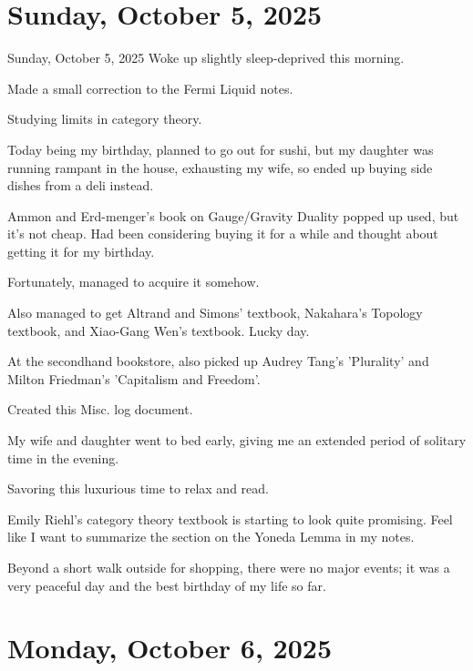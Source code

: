 \documentclass[dvipdfmx, autodetect-engine, aspectratio=169, 10.5pt]{beamer}
\begin{document}
\section{Sunday, October 5, 2025}

\begin{frame}{Sunday, October 5, 2025}
	\scriptsize
	Woke up slightly sleep-deprived this morning.

	Made a small correction to the Fermi Liquid notes.

	Studying limits in category theory.

	Today being my birthday, planned to go out for sushi, but my daughter was running rampant in the house, exhausting my wife, so ended up buying side dishes from a deli instead.

	Ammon and Erd-menger's book on Gauge/Gravity Duality popped up used, but it's not cheap.
	Had been considering buying it for a while and thought about getting it for my birthday.

	Fortunately, managed to acquire it somehow.

	Also managed to get Altrand and Simons' textbook, Nakahara's Topology textbook, and Xiao-Gang Wen's textbook.
	Lucky day.

	At the secondhand bookstore, also picked up Audrey Tang's 'Plurality' and
	Milton Friedman's 'Capitalism and Freedom'.

	Created this Misc. log document.

	My wife and daughter went to bed early, giving me an extended period of solitary time in the evening.

	Savoring this luxurious time to relax and read.

	Emily Riehl's category theory textbook is starting to look quite promising.
	Feel like I want to summarize the section on the Yoneda Lemma in my notes.

	Beyond a short walk outside for shopping, there were no major events; it was a very peaceful day and the best birthday of my life so far.
\end{frame}

\section{Monday, October 6, 2025}
\end{document}
